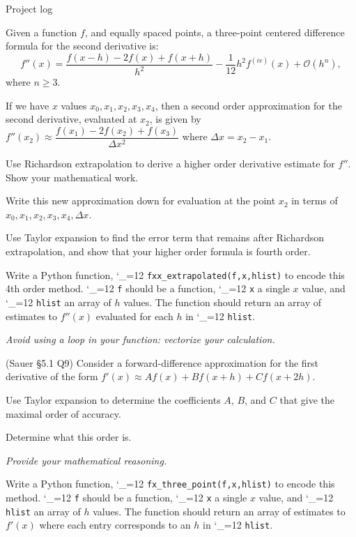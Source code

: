 \documentclass[12pt,letterpaper,noanswers]{exam}
\makeatletter
\newcommand{\pyf}{%
  \begingroup\catcode`_=12
  \pyf@
}
\newcommand{\pyf@}[1]{\texttt{#1}\endgroup}
\makeatother
\begin{document}
\begin{questions}

\item Project log

\item Given a function $f$, and equally spaced points, a three-point centered difference formula for the second derivative is:
\[f''(x) = \dfrac{f(x-h)-2f(x)+f(x+h)}{h^2}-\frac{1}{12}h^2f^{(iv)}(x) + \mathcal{O}(h^n),\]
where $n\geq 3$.

If we have $x$ values $x_0, x_1, x_2, x_3, x_4$, then a second order approximation for the second derivative, evaluated at $x_2$, is given by $f''(x_2)\approx \dfrac{f(x_1) - 2f(x_2) + f(x_3)}{\Delta x^2}$ where $\Delta x = x_2-x_1$.
\begin{parts}
\item Use Richardson extrapolation to derive a higher order derivative estimate for $f''$.  Show your mathematical work.

Write this new approximation down for evaluation at the point $x_2$ in terms of $x_0, x_1, x_2, x_3, x_4, \Delta x$.

\item Use Taylor expansion to find the error term that remains after Richardson extrapolation, and show that your higher order formula is fourth order.

\item Write a Python function, \pyf{fxx_extrapolated(f,x,hlist)} to encode this 4th order method.  \pyf{f} should be a function, \pyf{x} a single $x$ value, and \pyf{hlist} an array of $h$ values.  The function should return an array of estimates to $f''(x)$ evaluated for each  $h$ in \pyf{hlist}.

\emph{Avoid using a loop in your function: vectorize your calculation.}

\end{parts}
\question (Sauer \S 5.1 Q9) Consider a forward-difference approximation for the first derivative of the form $f'(x) \approx A f(x) + Bf(x+h) + Cf(x+2h)$.

\begin{parts}
    \item Use Taylor expansion to determine the coefficients $A$, $B$, and $C$ that give the maximal order of accuracy.  

Determine what this order is.

\emph{Provide your mathematical reasoning.}

\item Write a Python function, \pyf{fx_three_point(f,x,hlist)} to encode this method.  \pyf{f} should be a function, \pyf{x} a single $x$ value, and \pyf{hlist} an array of $h$ values.  The function should return an array of estimates to $f'(x)$ where each entry corresponds to an $h$ in \pyf{hlist}.


\end{parts}
\end{questions}
\end{document}
